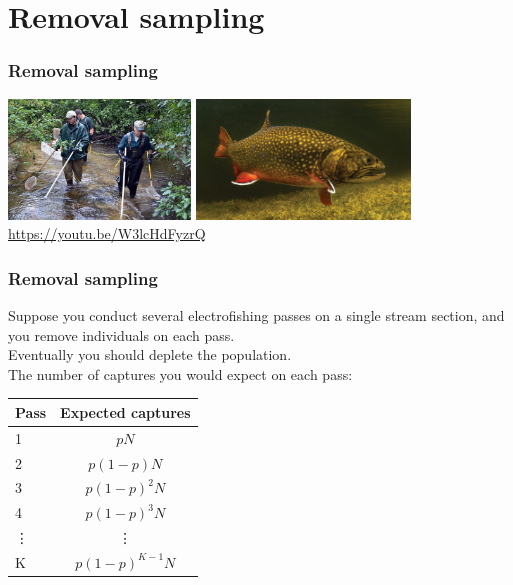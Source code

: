 \documentclass[color=usenames,dvipsnames]{beamer}\usepackage[]{graphicx}\usepackage[]{xcolor}
\begin{document}
\section{Removal sampling}


\begin{frame}
  \frametitle{Removal sampling}
  \centering
  \includegraphics[height=3.2cm]{figs/electrofishing} \hfill
  \includegraphics[height=3.2cm]{figs/brook_trout}
  \vfill
  \color{blue}
  \url{https://youtu.be/W3lcHdFyzrQ} \\
\end{frame}


\begin{frame}
  \frametitle{Removal sampling}
  \large
  { Suppose you conduct several electrofishing passes on a single
    stream section, and you remove individuals on each pass. \\}  
  \vfill
  \pause
  { Eventually you should deplete the population. \\}
  \vfill
  \pause
  { The number of captures you would expect on each pass:}
  \begin{center}
    \begin{tabular}{lc}
      \hline
      Pass & Expected captures \\
      \hline
      1 & $pN$ \\
      2 & $p(1-p)N$ \\
      3 & $p(1-p)^2N$ \\
      4 & $p(1-p)^3N$ \\
      \vdots & \vdots \\
      K & $p(1-p)^{K-1}N$ \\
      \hline
    \end{tabular}
  \end{center}
\end{frame}
\end{document}
